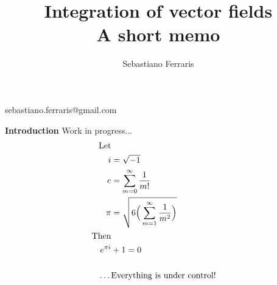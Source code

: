 \documentclass{ClassNotes}
\begin{document}
\title{Integration of vector fields \\ A short memo}

\IssueDue

\author{Sebastiano Ferraris}{sebastiano.ferraris@gmail.com}


\maketitle

\begin{center}
 {\bf Introduction}
 Work in progress...
 \begin{align*}
 \text{Let} \\
 i &= \sqrt{-1}\\
 e &= \sum_{m=0}^{\infty} \frac{1}{m!} \\
 \pi &= \sqrt{ 6 \Big( \sum_{m=1}^{\infty} \frac{1}{m^2} \Big)}\\
 \text{Then} \\
 e^{\pi i}& + 1 = 0 \\
 \text{~} \\
 \text{\dots}&\text{Everything is under control!}
 \end{align*}
\end{center}



\Body %




\clearpage
\pagestyle{empty}

 \tableofcontents

\clearpage


\pagestyle{fancy} 


\end{document}
